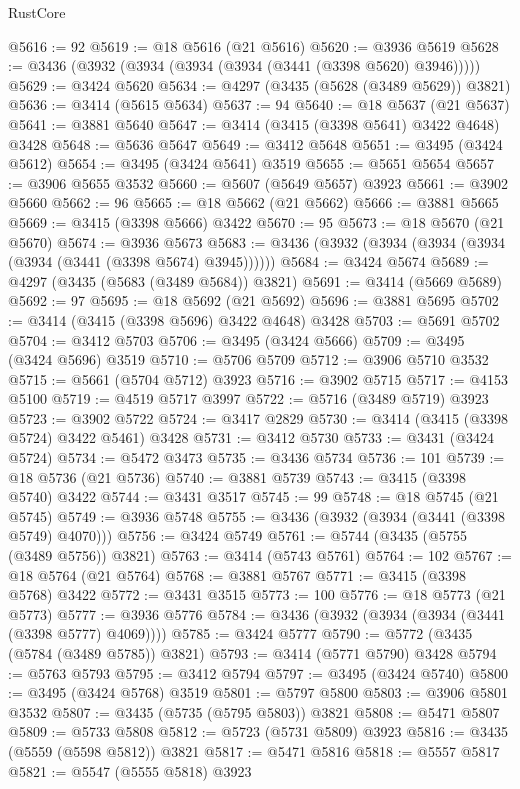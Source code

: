 \begin{lexlean}{RustCore}
\begin{coremodule}
@5616 := 92
@5619 := @18 @5616 (@21 @5616)
@5620 := @3936 @5619
@5628 := @3436 (@3932 (@3934 (@3934 (@3934 (@3441 (@3398 @5620) @3946)))))
@5629 := @3424 @5620
@5634 := @4297 (@3435 (@5628 (@3489 @5629)) @3821)
@5636 := @3414 (@5615 @5634)
@5637 := 94
@5640 := @18 @5637 (@21 @5637)
@5641 := @3881 @5640
@5647 := @3414 (@3415 (@3398 @5641) @3422 @4648) @3428
@5648 := @5636 @5647
@5649 := @3412 @5648
@5651 := @3495 (@3424 @5612)
@5654 := @3495 (@3424 @5641) @3519
@5655 := @5651 @5654
@5657 := @3906 @5655 @3532
@5660 := @5607 (@5649 @5657) @3923
@5661 := @3902 @5660
@5662 := 96
@5665 := @18 @5662 (@21 @5662)
@5666 := @3881 @5665
@5669 := @3415 (@3398 @5666) @3422
@5670 := 95
@5673 := @18 @5670 (@21 @5670)
@5674 := @3936 @5673
@5683 := @3436 (@3932 (@3934 (@3934 (@3934 (@3934 (@3441 (@3398 @5674) @3945))))))
@5684 := @3424 @5674
@5689 := @4297 (@3435 (@5683 (@3489 @5684)) @3821)
@5691 := @3414 (@5669 @5689)
@5692 := 97
@5695 := @18 @5692 (@21 @5692)
@5696 := @3881 @5695
@5702 := @3414 (@3415 (@3398 @5696) @3422 @4648) @3428
@5703 := @5691 @5702
@5704 := @3412 @5703
@5706 := @3495 (@3424 @5666)
@5709 := @3495 (@3424 @5696) @3519
@5710 := @5706 @5709
@5712 := @3906 @5710 @3532
@5715 := @5661 (@5704 @5712) @3923
@5716 := @3902 @5715
@5717 := @4153 @5100
@5719 := @4519 @5717 @3997
@5722 := @5716 (@3489 @5719) @3923
@5723 := @3902 @5722
@5724 := @3417 @2829
@5730 := @3414 (@3415 (@3398 @5724) @3422 @5461) @3428
@5731 := @3412 @5730
@5733 := @3431 (@3424 @5724)
@5734 := @5472 @3473
@5735 := @3436 @5734
@5736 := 101
@5739 := @18 @5736 (@21 @5736)
@5740 := @3881 @5739
@5743 := @3415 (@3398 @5740) @3422
@5744 := @3431 @3517
@5745 := 99
@5748 := @18 @5745 (@21 @5745)
@5749 := @3936 @5748
@5755 := @3436 (@3932 (@3934 (@3441 (@3398 @5749) @4070)))
@5756 := @3424 @5749
@5761 := @5744 (@3435 (@5755 (@3489 @5756)) @3821)
@5763 := @3414 (@5743 @5761)
@5764 := 102
@5767 := @18 @5764 (@21 @5764)
@5768 := @3881 @5767
@5771 := @3415 (@3398 @5768) @3422
@5772 := @3431 @3515
@5773 := 100
@5776 := @18 @5773 (@21 @5773)
@5777 := @3936 @5776
@5784 := @3436 (@3932 (@3934 (@3934 (@3441 (@3398 @5777) @4069))))
@5785 := @3424 @5777
@5790 := @5772 (@3435 (@5784 (@3489 @5785)) @3821)
@5793 := @3414 (@5771 @5790) @3428
@5794 := @5763 @5793
@5795 := @3412 @5794
@5797 := @3495 (@3424 @5740)
@5800 := @3495 (@3424 @5768) @3519
@5801 := @5797 @5800
@5803 := @3906 @5801 @3532
@5807 := @3435 (@5735 (@5795 @5803)) @3821
@5808 := @5471 @5807
@5809 := @5733 @5808
@5812 := @5723 (@5731 @5809) @3923
@5816 := @3435 (@5559 (@5598 @5812)) @3821
@5817 := @5471 @5816
@5818 := @5557 @5817
@5821 := @5547 (@5555 @5818) @3923

\end{coremodule}
\end{lexlean}
